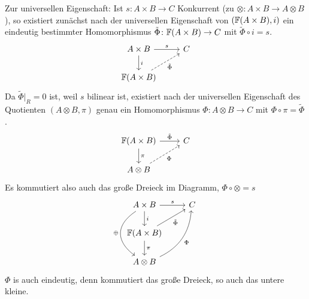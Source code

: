 \begin{kommentar}
\begin{enumerate}
    Zur universellen Eigenschaft:
    Ist $s \colon A \times B \to C$ Konkurrent (zu $\otimes \colon A \times B \to A \otimes B$), so existiert zunächst nach der universellen Eigenschaft von $(\mathbb{F}(A \times B), i)$ ein eindeutig bestimmter Homomorphismus $\tilde \Phi \colon \mathbb{F}(A \times B) \to C$ mit $\tilde \Phi \circ i = s$.
    \begin{equation*}
      \begin{tikzcd}
        A \times B \arrow{r}{s}
          \arrow{d}{i}
        & C\\
        \F(A \times B) \arrow[dashed,swap]{ur}{\tilde \Phi}
      \end{tikzcd}
    \end{equation*}
    Da $\tilde \Phi | _R = 0$ ist, weil $s$ bilinear ist, existiert nach der universellen Eigenschaft des Quotienten $(A \otimes B, \pi)$ genau ein Homomorphismus $\Phi \colon A \otimes B \to C$ mit $\Phi \circ \pi = \tilde \Phi$.
    \begin{equation*}
      \begin{tikzcd}
        \F(A \times B) \arrow{r}{\tilde \Phi}
          \arrow{d}{\pi}
        & C\\
        A \otimes B \arrow[dashed,swap]{ur}{\Phi}
      \end{tikzcd}
    \end{equation*}
    Es kommutiert also auch das große Dreieck im Diagramm, $\Phi \circ \otimes = s$
    \begin{equation*}
      \begin{tikzcd}
        A \times B \arrow{r}{s}
          \arrow{d}{i}
          \arrow[bend right,swap,out=305,in=235,looseness=1.4]{dd}{\oplus}
        & C\\
        \F(A \times B) \arrow[swap]{ur}{\tilde \Phi}
          \arrow{d}{\pi}
        \\
        A \otimes B \arrow[bend right,swap]{uur}{\Phi}
      \end{tikzcd}
    \end{equation*}
    $\Phi$ is auch eindeutig, denn kommutiert das große Dreieck, so auch das untere kleine.
  \end{enumerate}
\end{kommentar}

